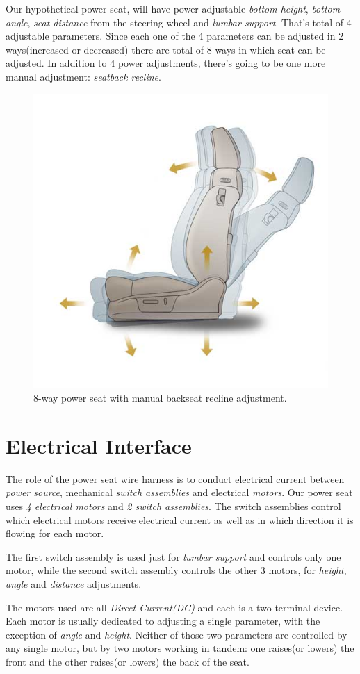 \documentclass[12pt,letterpaper]{article}
\begin{document}
Our hypothetical power seat, will have power adjustable \textit{bottom height}, \textit{bottom angle}, \textit{seat distance} from the steering wheel and \textit{lumbar support}. That’s total of 4 adjustable parameters. Since each one of the 4 parameters can be adjusted in 2 ways(increased or decreased) there are total of 8 ways in which seat can be adjusted. In addition to 4 power adjustments, there’s going to be one more manual adjustment: \textit{seatback recline}.
\begin{figure}[b!]
  \centering
  \includegraphics[width=0.70\linewidth]{8-way-seat.jpg}
  \caption{8-way power seat with manual backseat recline adjustment.}
  \label{fig:wireharness1}
\end{figure}
\newpage
{}
\section{Electrical Interface}
The role of the power seat wire harness is to conduct electrical current between \textit{power source}, mechanical \textit{switch assemblies} and electrical \textit{motors}. Our power seat uses \textit{4 electrical motors} and \textit{2 switch assemblies}. The switch assemblies control which electrical motors receive electrical current as well as in which direction it is flowing for each motor.

The first switch assembly is used just for \textit{lumbar support} and controls only one motor, while the second switch assembly controls the other 3 motors, for \textit{height}, \textit{angle} and \textit{distance} adjustments.

The motors used are all \textit{Direct Current(DC)} and each is a two-terminal device. Each motor is usually dedicated to adjusting a single parameter, with the exception of \textit{angle} and \textit{height}. Neither of those two parameters are controlled by any single motor, but by two motors working in tandem: one raises(or lowers) the front and the other raises(or lowers) the back of the seat.
\end{document}
